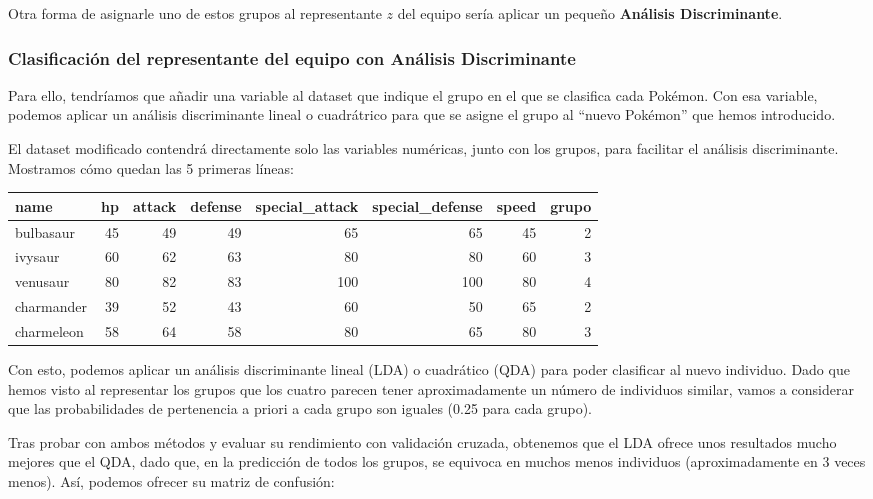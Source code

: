 \documentclass[
  11.8pt,
]{extreport}
\begin{document}
Otra forma de asignarle uno de estos grupos al representante \(z\) del
equipo sería aplicar un pequeño \textbf{Análisis Discriminante}.

\subsubsection{Clasificación del representante del equipo con Análisis
Discriminante}\label{clasificaciuxf3n-del-representante-del-equipo-con-anuxe1lisis-discriminante}

Para ello, tendríamos que añadir una variable al dataset que indique el
grupo en el que se clasifica cada Pokémon. Con esa variable, podemos
aplicar un análisis discriminante lineal o cuadrátrico para que se
asigne el grupo al ``nuevo Pokémon'' que hemos introducido.

El dataset modificado contendrá directamente solo las variables
numéricas, junto con los grupos, para facilitar el análisis
discriminante. Mostramos cómo quedan las 5 primeras líneas:

\begin{table}[H]
\centering\begingroup\fontsize{11.5}{13.5}\selectfont

\begin{tabular}{lrrrrrrr}
\toprule
name & hp & attack & defense & special\_attack & special\_defense & speed & grupo\\
\midrule
bulbasaur & 45 & 49 & 49 & 65 & 65 & 45 & 2\\
ivysaur & 60 & 62 & 63 & 80 & 80 & 60 & 3\\
venusaur & 80 & 82 & 83 & 100 & 100 & 80 & 4\\
charmander & 39 & 52 & 43 & 60 & 50 & 65 & 2\\
charmeleon & 58 & 64 & 58 & 80 & 65 & 80 & 3\\
\bottomrule
\end{tabular}
\endgroup{}
\end{table}

Con esto, podemos aplicar un análisis discriminante lineal (LDA) o
cuadrático (QDA) para poder clasificar al nuevo individuo. Dado que
hemos visto al representar los grupos que los cuatro parecen tener
aproximadamente un número de individuos similar, vamos a considerar que
las probabilidades de pertenencia a priori a cada grupo son iguales
(0.25 para cada grupo).

Tras probar con ambos métodos y evaluar su rendimiento con validación
cruzada, obtenemos que el LDA ofrece unos resultados mucho mejores que
el QDA, dado que, en la predicción de todos los grupos, se equivoca en
muchos menos individuos (aproximadamente en 3 veces menos). Así, podemos
ofrecer su matriz de confusión:
\end{document}
